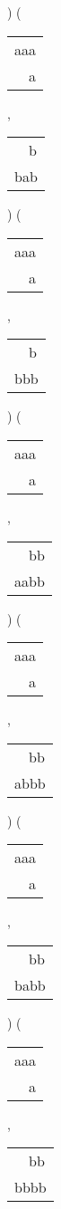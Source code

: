 ) 
 ( 
\begin{tabular}{|l|} \hline
aaa \\
\ \ a \\
\hline
\end{tabular} 
 , 
\begin{tabular}{|l|} \hline
\ \ b \\
bab \\
\hline
\end{tabular} 
) 
 ( 
\begin{tabular}{|l|} \hline
aaa \\
\ \ a \\
\hline
\end{tabular} 
 , 
\begin{tabular}{|l|} \hline
\ \ b \\
bbb \\
\hline
\end{tabular} 
) 
 ( 
\begin{tabular}{|l|} \hline
aaa \\
\ \ a \\
\hline
\end{tabular} 
 , 
\begin{tabular}{|l|} \hline
\ \ bb \\
aabb \\
\hline
\end{tabular} 
) 
 ( 
\begin{tabular}{|l|} \hline
aaa \\
\ \ a \\
\hline
\end{tabular} 
 , 
\begin{tabular}{|l|} \hline
\ \ bb \\
abbb \\
\hline
\end{tabular} 
) 
 ( 
\begin{tabular}{|l|} \hline
aaa \\
\ \ a \\
\hline
\end{tabular} 
 , 
\begin{tabular}{|l|} \hline
\ \ bb \\
babb \\
\hline
\end{tabular} 
) 
 ( 
\begin{tabular}{|l|} \hline
aaa \\
\ \ a \\
\hline
\end{tabular} 
 , 
\begin{tabular}{|l|} \hline
\ \ bb \\
bbbb \\
\hline
\end{tabular} 
